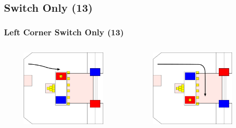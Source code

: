\documentclass{beamer}
\begin{document}
\subsection{Switch Only (13)}

\begin{frame}
 \frametitle{Left Corner Switch Only \alert{(13)}}
 \begin{columns}
  \begin{figure}
   \includegraphics[scale=0.15]{assets/paths/13_LR}
  \end{figure}
  \begin{figure}
   \includegraphics[scale=0.15]{assets/paths/13_RL}

\end{figure}
\end{columns}
\end{frame}
\end{document}
